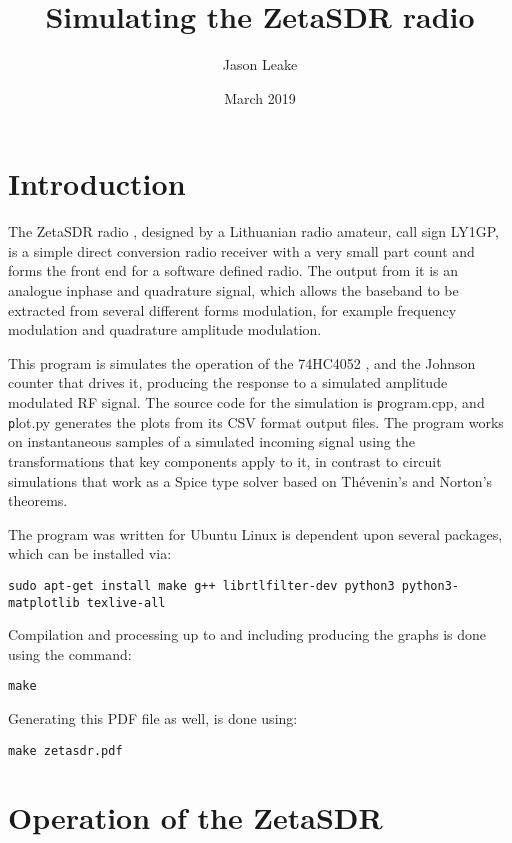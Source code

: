 \documentclass[11pt, twoside]{article}
\begin{document}
\title{Simulating the ZetaSDR radio}
\author{Jason Leake}
\date{March 2019}
\maketitle
\section{Introduction}
The ZetaSDR radio \citep{ly1gp:2007}, designed by a Lithuanian radio
amateur, call sign LY1GP, is a simple direct conversion radio receiver
with a very small part count and forms the front end for a software
defined radio. The output from it is an analogue inphase and
quadrature signal, which allows the baseband to be extracted from
several different forms modulation, for example frequency modulation
and quadrature amplitude modulation.

This program is simulates the operation of the 74HC4052
\citep{Motorola:1996}, and the Johnson counter that drives it,
producing the response to a simulated amplitude modulated RF
signal. The source code for the simulation is {\texttt program.cpp},
and {\texttt plot.py} generates the plots from its CSV format output
files.  The program works on instantaneous samples of a simulated
incoming signal using the transformations that key components apply to
it, in contrast to circuit simulations that work as a Spice type
solver based on Th\'evenin's and Norton's theorems.

The program was written for Ubuntu Linux is dependent upon several
packages, which can be installed via:

\begin{lstlisting}
sudo apt-get install make g++ librtlfilter-dev python3 python3-matplotlib texlive-all
\end{lstlisting}

Compilation and processing up to and including producing the graphs is
done using the command:

\begin{lstlisting}
make
\end{lstlisting}

Generating this PDF file as well, is done using:

\begin{lstlisting}
make zetasdr.pdf
\end{lstlisting}

\section{Operation of the ZetaSDR}
\end{document}
